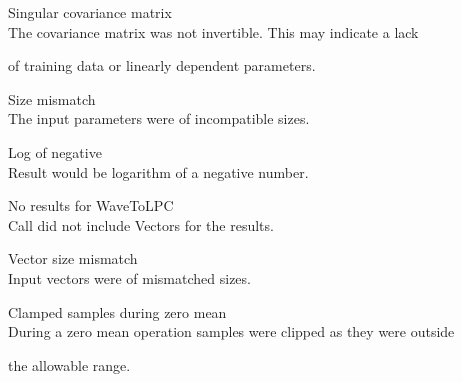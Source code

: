 \begin{itemize}
 


\begin{itemize}


    Singular covariance matrix\\


        The covariance matrix was not invertible.  This may indicate a lack


        of training data or linearly dependent parameters.





    Size mismatch\\


        The input parameters were of incompatible sizes.





    Log of negative\\


        Result would be logarithm of a negative number.





\end{itemize}










\begin{itemize}


    No results for WaveToLPC\\


        Call did not include Vectors for the results.





    Vector size mismatch\\


        Input vectors were of mismatched sizes.





    Clamped samples during zero mean\\


        During a zero mean operation samples were clipped as they were outside


        the allowable range.





\end{itemize}






\end{itemize}
